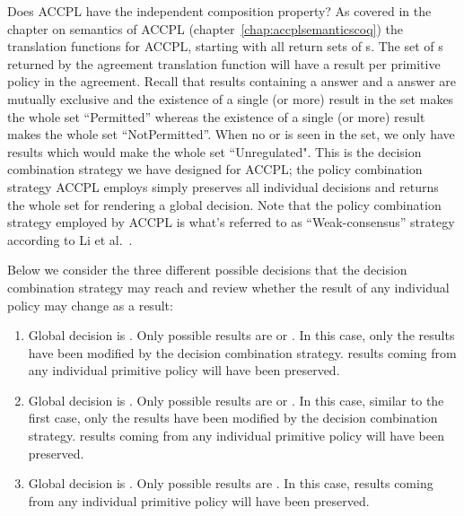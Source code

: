 Does \ac{ACCPL} have the independent composition property? As covered in the chapter on semantics of \ac{ACCPL} (chapter~\ref{chap:accplsemanticscoq}) the translation functions for \ac{ACCPL}, starting with  all return sets of s. The set of s returned by the agreement translation function will have a result per primitive policy in the agreement. Recall that results containing a  answer and a  answer are mutually exclusive and the existence of a single (or more)  result in the set makes the whole set ``Permitted'' whereas the existence of a single (or more)  result makes the whole set ``NotPermitted''. When no  or  is seen in the set, we only have  results which would make the whole set ``Unregulated". This is the decision combination strategy we have designed for \ac{ACCPL}; the policy combination strategy \ac{ACCPL} employs simply preserves all individual decisions and returns the whole set for rendering a global decision. Note that the policy combination strategy employed by \ac{ACCPL} is what's referred to as ``Weak-consensus'' strategy according to Li et al.~\cite{LiWQBRLL09}. 



Below we consider the three different possible decisions that the decision combination strategy may reach and review whether the result of any individual policy may change as a result:

\begin{enumerate}
  \item Global decision is . Only possible results are  or . In this case, only the  results have been modified by the decision combination strategy.  results coming from any individual primitive policy will have been preserved.
  \item Global decision is . Only possible results are  or \newline {}. In this case, similar to the first case, only the  results have been modified by the decision combination strategy.  results coming from any individual primitive policy will have been preserved.
   \item Global decision is . Only possible results are . In this case, results coming from any individual primitive policy will have been preserved.
\end{enumerate}

